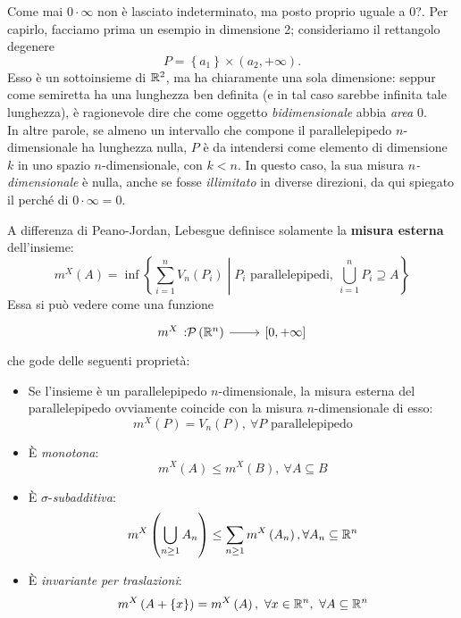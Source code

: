 	\begin{observe}
		Come mai $0\cdot \infty$ non è lasciato indeterminato, ma posto proprio uguale a 0?. Per capirlo, facciamo prima un esempio in dimensione 2; consideriamo il rettangolo degenere
		\begin{equation*}
			P=\left\{a_1\right\}\times\left(a_2,+\infty\right).
		\end{equation*}
		Esso è un sottoinsieme di $\mathbb{R}^2$, ma ha chiaramente una sola dimensione: seppur come semiretta ha una lunghezza ben definita (e in tal caso sarebbe infinita tale lunghezza), è ragionevole dire che come oggetto \textit{bidimensionale} abbia \textit{area} $0$.\\
		In altre parole, se almeno un intervallo che compone il parallelepipedo $n$-dimensionale ha lunghezza nulla, $P$ è da intendersi come elemento di dimensione $k$ in uno spazio $n$-dimensionale, con $k< n$.
		In questo caso, la sua misura $n$\textit{-dimensionale} è nulla, anche se fosse \textit{illimitato} in diverse direzioni, da qui spiegato il perché di $0\cdot \infty =0$.
	\end{observe}
	A differenza di Peano-Jordan, Lebesgue definisce solamente la \textbf{misura esterna} dell'insieme:
	\begin{equation}
		m^X\left(A\right)=\inf\left\{\sum_{i=1}^{n}V_n\left(P_i\right)\middle| P_i\text{ parallelepipedi},\ \bigcup_{i=1}^nP_i\supseteq A\right\}
	\end{equation}
	Essa si può vedere come una funzione
	\begin{equation}
		\funz{m^X}{\setpart{\realset^n}}{\left[0,+\infty\right]}
	\end{equation}
	che gode delle seguenti proprietà:
	\begin{itemize}
		\item Se l'insieme è un parallelepipedo $n$-dimensionale, la misura esterna del parallelepipedo ovviamente coincide con la misura $n$-dimensionale di esso:
		\begin{equation}
			m^X\left(P\right)=V_n\left(P\right),\ \forall P\text{ parallelepipedo}
		\end{equation}
		\item È \textit{monotona}:
		\begin{equation}
			m^X\left(A\right)\leq m^X\left(B\right),\ \forall A\subseteq B
		\end{equation}
		\item È $\sigma$-\textit{subadditiva}:
		\begin{equation}
			m^X\left(\bigcup_{n\geq 1}A_n\right)\leq \sum_{n\geq 1}m^X\left(A_n\right), \forall A_n\subseteq \mathbb{R}^n
		\end{equation}
		\item È \textit{invariante per traslazioni}:
		\begin{equation}
			m^X\left(A+\left\{x\right\}\right)=m^X\left(A\right),\ \forall x\in\realset^n,\ \forall A\subseteq\realset^n
		\end{equation}
	\end{itemize}
